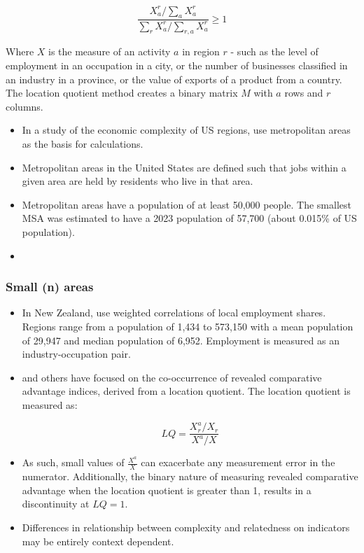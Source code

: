 \documentclass[
  number]{elsarticle}
\providecommand{\tightlist}{%
  \setlength{\itemsep}{0pt}\setlength{\parskip}{0pt}}\usepackage{longtable,booktabs,array}
\begin{document}
\[\frac{X_a^r/\sum_{a}X_a^r}{\sum_{r}X_a^r/\sum_{r,a}X_a^r} \geq 1\]

Where \(X\) is the measure of an activity \(a\) in region \(r\) - such
as the level of employment in an occupation in a city, or the number of
businesses classified in an industry in a province, or the value of
exports of a product from a country. The location quotient method
creates a binary matrix \(M\) with \(a\) rows and \(r\) columns.

\begin{itemize}
\tightlist
\item
  In a study of the economic complexity of US regions, \citep{ecus} use
  metropolitan areas as the basis for calculations.
\item
  Metropolitan areas in the United States are defined such that jobs
  within a given area are held by residents who live in that area.
\item
  Metropolitan areas have a population of at least 50,000 people. The
  smallest MSA was estimated to have a 2023 population of 57,700 (about
  0.015\% of US population).
\item
\end{itemize}

\subsubsection{Small (n) areas}\label{small-n-areas}

\begin{itemize}
\item
  In New Zealand, \citep{ecnz} use weighted correlations of local
  employment shares. Regions range from a population of 1,434 to 573,150
  with a mean population of 29,947 and median population of 6,952.
  Employment is measured as an industry-occupation pair.
\item
  \citep{hidalgo2007} and others have focused on the co-occurrence of
  revealed comparative advantage indices, derived from a location
  quotient. The location quotient is measured as:

  \[
  LQ = \frac{X_r^a/X_r}{X^a/X}
  \]
\item
  As such, small values of \(\frac{X^a}{X}\) can exacerbate any
  measurement error in the numerator. Additionally, the binary nature of
  measuring revealed comparative advantage when the location quotient is
  greater than 1, results in a discontinuity at \(LQ = 1\).
\item
  Differences in relationship between complexity and relatedness on
  indicators may be entirely context dependent.
\end{itemize}
\end{document}
